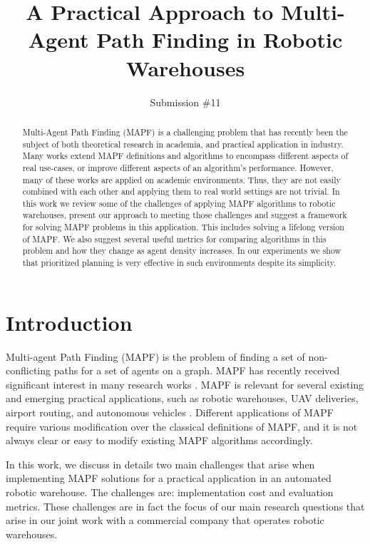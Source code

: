 \documentclass{article}
\title{A Practical Approach to Multi-Agent Path Finding in Robotic Warehouses}
\author{
    Submission \#11
}
\author{
\mbox{Jonathan Morag$^{1,2}$}\and
\mbox{Ariel Felner$^1$\and}
\mbox{Roni Stern$^1$\and}
\mbox{Dor Atzmon$^1$\and}
\mbox{Eli Boyarski$^1$\and}
\mbox{Sria Louis$^2$\And}
\mbox{Meir Toledano$^2$}
\affiliations
$^1$Ben-Gurion University of the Negev\\
$^2$Get Fabric, Inc.\\
\emails
moragj@post.bgu.ac.il,
felner@bgu.ac.il,
\{sternron, dorat, boyarske\}@post.bgu.ac.il,
\mbox{\{sria.louis, meir.toledano\}@getfabric.com}
}
\begin{document}
\maketitle

\begin{abstract}
    \begin{small}
    Multi-Agent Path Finding (MAPF) is a challenging problem that has recently been the subject of both theoretical research in academia, and practical application in industry. Many works extend MAPF definitions and algorithms to encompass different aspects of real use-cases, or improve different aspects of an algorithm's performance. However, many of these works are applied on academic environments. Thus, they are not easily combined with each other and applying them to real world settings are not trivial.
    In this work we review some of the challenges of applying MAPF algorithms to robotic warehouses, present our approach to meeting those challenges and suggest a framework for solving MAPF problems in this application. This includes solving a lifelong version of MAPF. We also suggest several useful metrics for comparing algorithms in this problem and how they change as agent density increases. In our experiments we show that prioritized planning is very effective in such environments despite its simplicity.
    \end{small}
\end{abstract}

\section{Introduction}

Multi-agent Path Finding (MAPF) is the problem of finding a set of non-conflicting paths for a set of agents on a graph. MAPF has recently received significant interest in many research works \cite{stern2019multi,felner2017search}. MAPF is relevant for several existing and emerging practical applications, such as robotic warehouses, UAV deliveries, airport routing, and autonomous vehicles \cite{ma2019lifelong,ho2019pre,li2019departure,dresner2008multiagent}. Different applications of MAPF require various modification over the classical definitions of MAPF, and it is not always clear or easy to modify existing MAPF algorithms accordingly. 

In this work, we discuss in details two main challenges that arise when implementing MAPF solutions for a practical application in an automated robotic warehouse. The challenges are: implementation cost and evaluation metrics. These challenges are in fact the focus of our main research questions that arise in our joint work with a commercial company that operates robotic warehouses.
\end{document}
